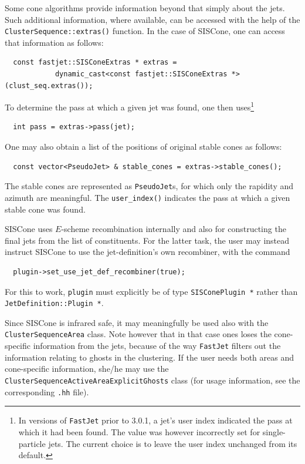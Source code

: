 \documentclass[12pt,a4]{article}
\newcommand{\fastjet}{\texttt{FastJet}\xspace}
\newcommand{\ttt}[1]{{\small\texttt{#1}}}
\begin{document}
Some cone algorithms provide information beyond that simply about the
jets.
%
Such additional information, where available, can be accessed with the
help of the \ttt{ClusterSequence::extras()} function.
%
In the case of SISCone, one can access that information as follows:
\begin{lstlisting}
  const fastjet::SISConeExtras * extras = 
            dynamic_cast<const fastjet::SISConeExtras *>(clust_seq.extras());
\end{lstlisting}
To determine the pass at which a given jet was found, one then
uses\footnote{ In versions of \fastjet prior to 3.0.1, a jet's user
  index indicated the pass at which it had been found. The
  value was however incorrectly set for single-particle
  jets. The current choice is to leave the user index unchanged from
  its default.}
\begin{lstlisting}
  int pass = extras->pass(jet);
\end{lstlisting}
%
One may also obtain a list of the positions of original stable
cones as follows:
\begin{lstlisting}
  const vector<PseudoJet> & stable_cones = extras->stable_cones();
\end{lstlisting}
The stable cones are represented as \ttt{PseudoJet}s, for which only the
rapidity and azimuth are meaningful. The \verb:user_index(): indicates
the pass at which a given stable cone was found.

SISCone uses $E$-scheme recombination internally and also for
constructing the final jets from the list of constituents. 
%
For the latter task, the user may instead instruct SISCone to use the
jet-definition's own recombiner, with the command
\begin{lstlisting}
  plugin->set_use_jet_def_recombiner(true);
\end{lstlisting}
For this to work, \ttt{plugin} must explicitly be of type
\ttt{SISConePlugin *} rather than \ttt{JetDefinition::Plugin *}. 

Since SISCone is infrared safe, it may meaningfully be used also with
the \verb:ClusterSequenceArea: class. Note however that in that
case ones loses the cone-specific information from the jets, because
of the way \fastjet filters out the information relating to ghosts in
the clustering. If the user needs both areas and cone-specific
information, she/he may use the
\verb:ClusterSequenceActiveAreaExplicitGhosts: class (for usage
information, see the corresponding \verb:.hh: file). 
\end{document}
